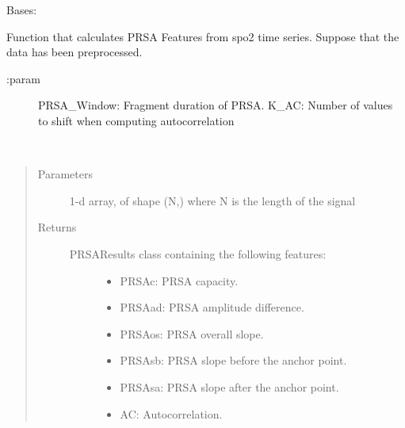 \documentclass[letterpaper,10pt,english]{sphinxmanual}
\begin{document}
\begin{fulllineitems}
\label{\detokenize{OBM:OBM.PeriodicityMeasures.PRSAMeasures}}
Bases: 

Function that calculates PRSA Features from spo2 time series.
Suppose that the data has been preprocessed.
\begin{description}
\item[{:param}] \leavevmode
PRSA\_Window: Fragment duration of PRSA.
K\_AC: Number of values to shift when computing autocorrelation

\end{description}

\begin{fulllineitems}
\label{\detokenize{OBM:OBM.PeriodicityMeasures.PRSAMeasures.compute}}~\begin{quote}\begin{description}
\item[{Parameters}] \leavevmode
{} \textendash{} 1-d array, of shape (N,) where N is the length of the signal

\item[{Returns}] \leavevmode
\begin{description}
\item[{PRSAResults class containing the following features:}] \leavevmode\begin{itemize}
\item {} 
PRSAc: PRSA capacity.

\item {} 
PRSAad: PRSA amplitude difference.

\item {} 
PRSAos: PRSA overall slope.

\item {} 
PRSAsb: PRSA slope before the anchor point.

\item {} 
PRSAsa: PRSA slope after the anchor point.

\item {} 
AC: Autocorrelation.

\end{itemize}

\end{description}


\end{description}\end{quote}

\end{fulllineitems}


\end{fulllineitems}
\end{document}
